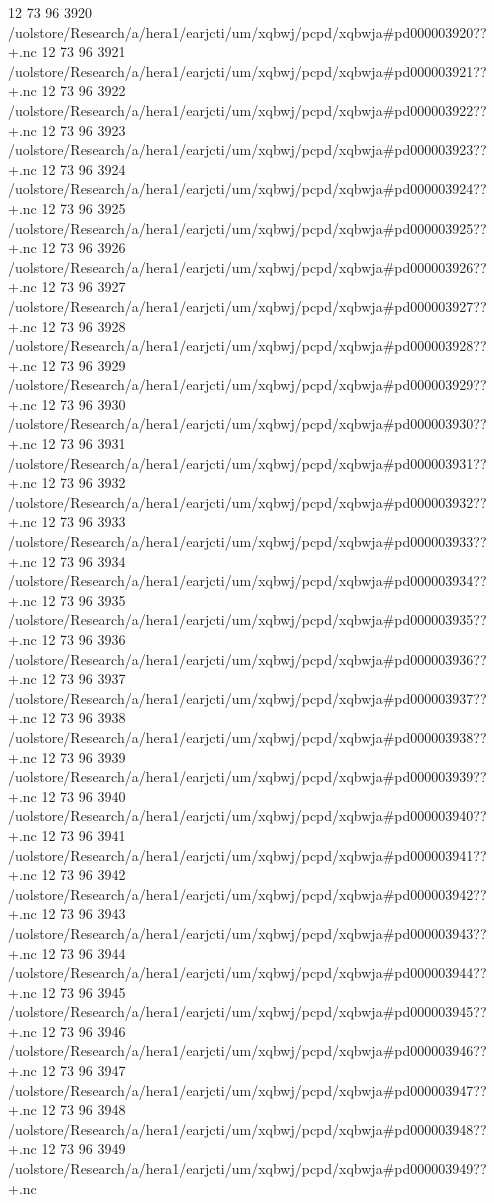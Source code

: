 12 73 96
3920
/uolstore/Research/a/hera1/earjcti/um/xqbwj/pcpd/xqbwja#pd000003920??+.nc
12 73 96
3921
/uolstore/Research/a/hera1/earjcti/um/xqbwj/pcpd/xqbwja#pd000003921??+.nc
12 73 96
3922
/uolstore/Research/a/hera1/earjcti/um/xqbwj/pcpd/xqbwja#pd000003922??+.nc
12 73 96
3923
/uolstore/Research/a/hera1/earjcti/um/xqbwj/pcpd/xqbwja#pd000003923??+.nc
12 73 96
3924
/uolstore/Research/a/hera1/earjcti/um/xqbwj/pcpd/xqbwja#pd000003924??+.nc
12 73 96
3925
/uolstore/Research/a/hera1/earjcti/um/xqbwj/pcpd/xqbwja#pd000003925??+.nc
12 73 96
3926
/uolstore/Research/a/hera1/earjcti/um/xqbwj/pcpd/xqbwja#pd000003926??+.nc
12 73 96
3927
/uolstore/Research/a/hera1/earjcti/um/xqbwj/pcpd/xqbwja#pd000003927??+.nc
12 73 96
3928
/uolstore/Research/a/hera1/earjcti/um/xqbwj/pcpd/xqbwja#pd000003928??+.nc
12 73 96
3929
/uolstore/Research/a/hera1/earjcti/um/xqbwj/pcpd/xqbwja#pd000003929??+.nc
12 73 96
3930
/uolstore/Research/a/hera1/earjcti/um/xqbwj/pcpd/xqbwja#pd000003930??+.nc
12 73 96
3931
/uolstore/Research/a/hera1/earjcti/um/xqbwj/pcpd/xqbwja#pd000003931??+.nc
12 73 96
3932
/uolstore/Research/a/hera1/earjcti/um/xqbwj/pcpd/xqbwja#pd000003932??+.nc
12 73 96
3933
/uolstore/Research/a/hera1/earjcti/um/xqbwj/pcpd/xqbwja#pd000003933??+.nc
12 73 96
3934
/uolstore/Research/a/hera1/earjcti/um/xqbwj/pcpd/xqbwja#pd000003934??+.nc
12 73 96
3935
/uolstore/Research/a/hera1/earjcti/um/xqbwj/pcpd/xqbwja#pd000003935??+.nc
12 73 96
3936
/uolstore/Research/a/hera1/earjcti/um/xqbwj/pcpd/xqbwja#pd000003936??+.nc
12 73 96
3937
/uolstore/Research/a/hera1/earjcti/um/xqbwj/pcpd/xqbwja#pd000003937??+.nc
12 73 96
3938
/uolstore/Research/a/hera1/earjcti/um/xqbwj/pcpd/xqbwja#pd000003938??+.nc
12 73 96
3939
/uolstore/Research/a/hera1/earjcti/um/xqbwj/pcpd/xqbwja#pd000003939??+.nc
12 73 96
3940
/uolstore/Research/a/hera1/earjcti/um/xqbwj/pcpd/xqbwja#pd000003940??+.nc
12 73 96
3941
/uolstore/Research/a/hera1/earjcti/um/xqbwj/pcpd/xqbwja#pd000003941??+.nc
12 73 96
3942
/uolstore/Research/a/hera1/earjcti/um/xqbwj/pcpd/xqbwja#pd000003942??+.nc
12 73 96
3943
/uolstore/Research/a/hera1/earjcti/um/xqbwj/pcpd/xqbwja#pd000003943??+.nc
12 73 96
3944
/uolstore/Research/a/hera1/earjcti/um/xqbwj/pcpd/xqbwja#pd000003944??+.nc
12 73 96
3945
/uolstore/Research/a/hera1/earjcti/um/xqbwj/pcpd/xqbwja#pd000003945??+.nc
12 73 96
3946
/uolstore/Research/a/hera1/earjcti/um/xqbwj/pcpd/xqbwja#pd000003946??+.nc
12 73 96
3947
/uolstore/Research/a/hera1/earjcti/um/xqbwj/pcpd/xqbwja#pd000003947??+.nc
12 73 96
3948
/uolstore/Research/a/hera1/earjcti/um/xqbwj/pcpd/xqbwja#pd000003948??+.nc
12 73 96
3949
/uolstore/Research/a/hera1/earjcti/um/xqbwj/pcpd/xqbwja#pd000003949??+.nc
